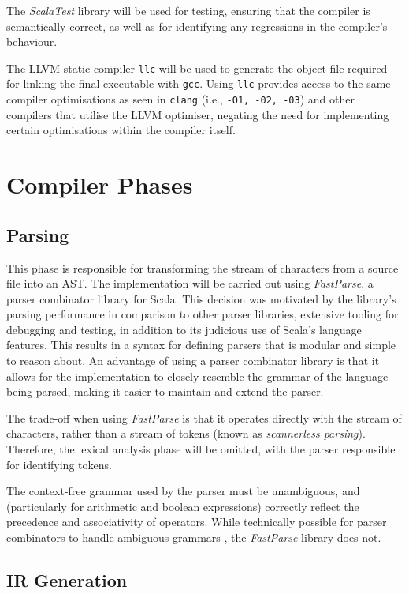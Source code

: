 The \emph{ScalaTest} library will be used for testing, ensuring that the compiler is semantically
correct, as well as for identifying any regressions in the compiler's behaviour.

The LLVM static compiler \texttt{llc} will be used to generate the object file required for linking
the final executable with \texttt{gcc}. Using \texttt{llc} provides access to the same compiler
optimisations as seen in \texttt{clang} (i.e., \texttt{-O1, -02, -03}) and other compilers that
utilise the LLVM optimiser, negating the need for implementing certain optimisations within the
compiler itself.

\section{Compiler Phases}

\subsection{Parsing}

This phase is responsible for transforming the stream of characters from a source file into an AST.
The implementation will be carried out using \emph{FastParse}, a parser combinator library for
Scala. This decision was motivated by the library's parsing performance in comparison to other
parser libraries, extensive tooling for debugging and testing, in addition to its judicious use of
Scala's language features. This results in a syntax for defining parsers that is modular and simple
to reason about. An advantage of using a parser combinator library is that it allows for the
implementation to closely resemble the grammar of the language being parsed, making it easier to
maintain and extend the parser.

The trade-off when using \emph{FastParse} is that it operates directly with the stream of
characters, rather than a stream of tokens (known as \emph{scannerless parsing}). Therefore, the
lexical analysis phase will be omitted, with the parser responsible for identifying tokens.

The context-free grammar used by the parser must be unambiguous, and
(particularly for arithmetic and boolean expressions) correctly reflect the precedence and
associativity of operators. While technically possible for parser combinators to handle
ambiguous grammars \autocite{frost2008recursiveparsers}, the \emph{FastParse} library does not.

\subsection{IR Generation}

